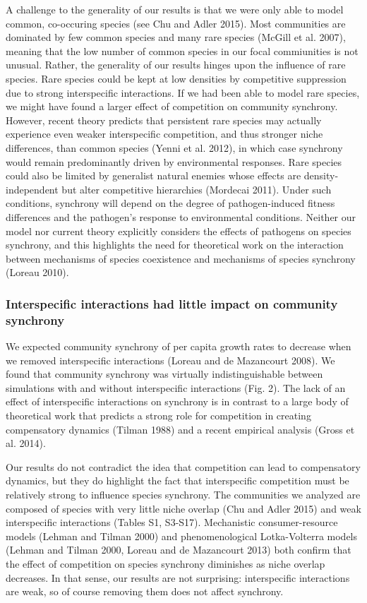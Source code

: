 \documentclass[12pt,]{article}
\begin{document}
A challenge to the generality of our results is that we were only able
to model common, co-occuring species (see Chu and Adler 2015). Most
communities are dominated by few common species and many rare species
(McGill et al. 2007), meaning that the low number of common species in
our focal commiunities is not unusual. Rather, the generality of our
results hinges upon the influence of rare species. Rare species could be
kept at low densities by competitive suppression due to strong
interspecific interactions. If we had been able to model rare species,
we might have found a larger effect of competition on community
synchrony. However, recent theory predicts that persistent rare species
may actually experience even weaker interspecific competition, and thus
stronger niche differences, than common species (Yenni et al. 2012), in
which case synchrony would remain predominantly driven by environmental
responses. Rare species could also be limited by generalist natural
enemies whose effects are density-independent but alter competitive
hierarchies (Mordecai 2011). Under such conditions, synchrony will
depend on the degree of pathogen-induced fitness differences and the
pathogen's response to environmental conditions. Neither our model nor
current theory explicitly considers the effects of pathogens on species
synchrony, and this highlights the need for theoretical work on the
interaction between mechanisms of species coexistence and mechanisms of
species synchrony (Loreau 2010).

\subsubsection{Interspecific interactions had little impact on community
synchrony}\label{interspecific-interactions-had-little-impact-on-community-synchrony}

We expected community synchrony of per capita growth rates to decrease
when we removed interspecific interactions (Loreau and {{de Mazancourt}}
2008). We found that community synchrony was virtually indistinguishable
between simulations with and without interspecific interactions (Fig.
2). The lack of an effect of interspecific interactions on synchrony is
in contrast to a large body of theoretical work that predicts a strong
role for competition in creating compensatory dynamics (Tilman 1988) and
a recent empirical analysis (Gross et al. 2014).

Our results do not contradict the idea that competition can lead to
compensatory dynamics, but they do highlight the fact that interspecific
competition must be relatively strong to influence species synchrony.
The communities we analyzed are composed of species with very little
niche overlap (Chu and Adler 2015) and weak interspecific interactions
(Tables S1, S3-S17). Mechanistic consumer-resource models (Lehman and
Tilman 2000) and phenomenological Lotka-Volterra models (Lehman and
Tilman 2000, Loreau and {{de Mazancourt}} 2013) both confirm that the
effect of competition on species synchrony diminishes as niche overlap
decreases. In that sense, our results are not surprising: interspecific
interactions are weak, so of course removing them does not affect
synchrony.
\end{document}
